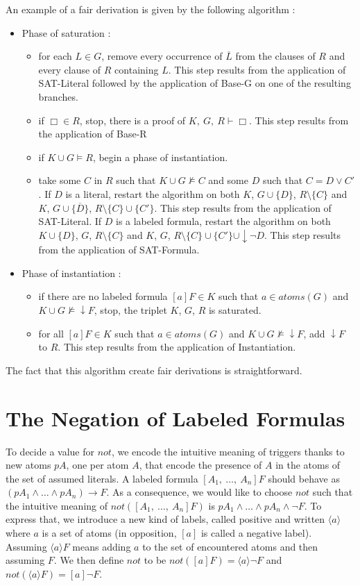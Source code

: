 \documentclass[a4paper,10pt]{article}
\newcommand{\atoms}{\mathit{atoms}}
\newcommand{\gen}{\vdash}
\newcommand{\nnot}{\mathit{not}}
\begin{document}
\noindent
An example of a fair derivation is given by the following algorithm :
\begin{itemize}
 \item Phase of saturation :
   \begin{itemize}
    \item for each $L\in G$, remove every occurrence of $\overline L$ from the clauses of $R$ and
every clause of $R$ containing $L$. This step results from the application of {\sc SAT-Literal}
followed by the application of {\sc Base-G} on one of the resulting branches.
    \item if $\Box\in R$, stop, there is a proof of $K,\ G,\ R\gen\Box$.
This step results from the application of {\sc Base-R}
    \item if $K\cup G\vDash R$, begin a phase of instantiation.
    \item take some $C$ in $R$ such that $K\cup G\nvDash C$ and some $D$ such that $C=D\vee C'$.
If $D$ is a literal, restart the algorithm on both $K$, $G\cup\{D\}$, $R\setminus\{C\}$ and
$K$, $G\cup\{\overline D\}$, $R\setminus\{C\}\cup\{C'\}$. This step results from the application
of {\sc SAT-Literal}. If $D$ is a labeled formula, restart the algorithm on both
$K\cup\{D\}$, $G$, $R\setminus\{C\}$ and
$K$, $G$, $R\setminus\{C\}\cup\{C'\}\cup\downarrow\neg D$. This step results from the application
of {\sc SAT-Formula}.
   \end{itemize}
 \item Phase of instantiation :
   \begin{itemize}
    \item if there are no labeled formula $[a]F\in K$ such that $a\in\atoms(G)$ and
$K\cup G\nvDash\downarrow F$, stop, the triplet $K$, $G$, $R$ is saturated.
    \item for all $[a]F\in K$ such that $a\in\atoms(G)$ and $K\cup G\nvDash\downarrow F$,
add $\downarrow F$ to $R$. This step results from the application of {\sc Instantiation}.
   \end{itemize}
\end{itemize}
The fact that this algorithm create fair derivations is straightforward.

\section{The Negation of Labeled Formulas}
To decide a value for $\nnot$, we encode the intuitive meaning of triggers thanks to new atoms
$pA$, one per atom $A$, that encode the presence of $A$ in the atoms of the set of assumed literals.
A labeled formula $[A_1,\ \dots,\ A_n]F$ should behave as $(pA_1\wedge\dots\wedge pA_n)\rightarrow F$.
As a consequence, we would like to choose $\nnot$ such that the intuitive meaning of
$\nnot([A_1,\ \dots,\ A_n]F)$ is $pA_1\wedge\dots\wedge pA_n\wedge\neg F$. To express that,
we introduce a new kind of labels, called positive and written $\langle a\rangle$ where $a$ is a set
of atoms (in opposition, $[a]$ is called a negative label). Assuming $\langle a\rangle F$
means adding $a$ to the set of encountered atoms and then assuming $F$. We then define $\nnot$ to be
$\nnot([a]F)=\langle a\rangle\neg F$ and $\nnot(\langle a\rangle F)=[a]\neg F$.
\end{document}
